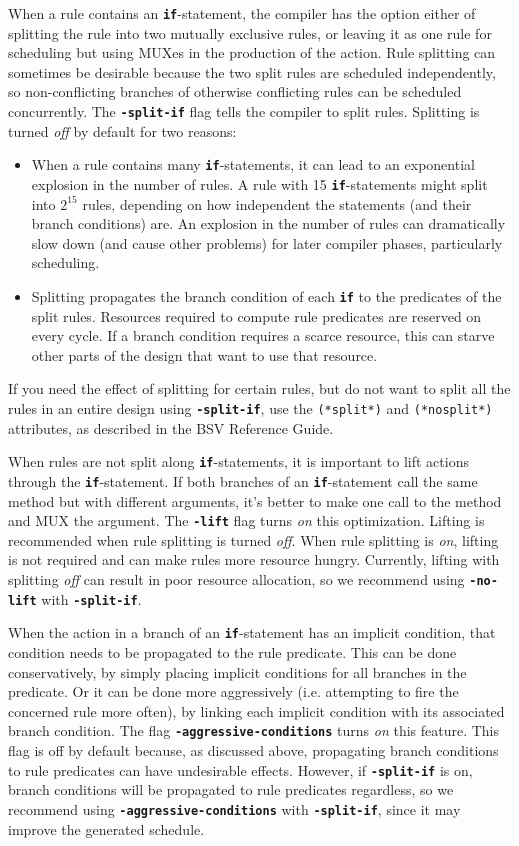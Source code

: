 \documentclass{article}
\newcommand{\te}[1]{\texttt{#1}}
\begin{document}
When a rule contains an {\bf\tt if}-statement, the compiler has the
option either of splitting the rule into two mutually exclusive rules,
or leaving it as one rule for scheduling but using MUXes in the
production of the action. Rule splitting can sometimes be desirable
because the two split rules are scheduled independently, so
non-conflicting branches of otherwise conflicting rules can be scheduled
concurrently. The {\bf\tt -split-if} flag tells the compiler to split
rules. Splitting is turned \emph{off} by default for two reasons:
\begin{itemize}
\item When a rule contains many {\bf\tt if}-statements, it can lead to an
exponential explosion in the number of rules. A rule with 15
{\bf\tt if}-statements might split into $2^{15}$ rules, depending on how
independent the statements (and their branch conditions) are. An explosion
in the number of rules can dramatically slow down (and cause other problems)
for later compiler phases, particularly scheduling.
\item Splitting propagates the branch condition of each {\bf\tt if} to the
predicates of the split rules. Resources required to compute rule predicates
are reserved on every cycle. If a branch condition requires a scarce resource,
this can starve other parts of the design that want to use that resource.
\end{itemize}
If you need the effect of splitting for certain rules, but do not want to
split all the rules in an entire design using {\bf\tt -split-if}, use
the \te{(*split*)} and \te{(*nosplit*)} attributes, as described in the
BSV Reference Guide.

When rules are not split along {\bf\tt if}-statements, it is important
to lift actions through the {\bf\tt if}-statement.  If both branches
of an {\bf\tt if}-statement call the same method but with different
arguments, it's better to make one call to the method and MUX the
argument. The {\bf\tt -lift} flag turns \emph{on} this optimization. Lifting
is recommended when rule splitting is turned \emph{off}. When rule splitting
is \emph{on}, lifting is not required and can make rules more resource
hungry. Currently, lifting with splitting \emph{off} can result in
poor resource allocation, so we recommend using {\bf\tt -no-lift}
with {\bf\tt -split-if}.

When the action in a branch of an {\bf\tt if}-statement has an
implicit condition, that condition needs to be propagated to the rule
predicate. This can be done conservatively, by simply placing implicit
conditions for all branches in the predicate. Or it can be done more
aggressively (i.e. attempting to fire the concerned rule more often),
by linking each implicit condition with its associated branch condition.
The flag {\bf\tt -aggressive-conditions} turns \emph{on} this feature.
This flag is off by default because, as discussed above, propagating
branch conditions to rule predicates can have undesirable effects. However,
if {\bf\tt -split-if} is on, branch conditions will be propagated to
rule predicates regardless, so we recommend using {\bf\tt -aggressive-conditions}
with {\bf\tt -split-if}, since it may improve the generated schedule.
\end{document}
